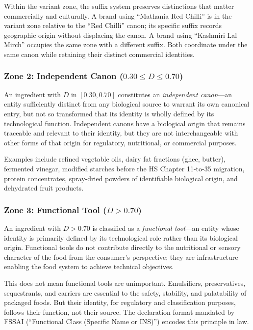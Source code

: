 \documentclass[12pt,a3paper]{article}
\begin{document}
Within the variant zone, the suffix system preserves distinctions that matter commercially and culturally. A brand using ``Mathania Red Chilli'' is in the variant zone relative to the ``Red Chilli'' canon; its specific suffix records geographic origin without displacing the canon. A brand using ``Kashmiri Lal Mirch'' occupies the same zone with a different suffix. Both coordinate under the same canon while retaining their distinct commercial identities.

\subsubsection{Zone 2: Independent Canon ($0.30 \leq D \leq 0.70$)}

An ingredient with $D$ in $[0.30, 0.70]$ constitutes an \textit{independent canon}---an entity sufficiently distinct from any biological source to warrant its own canonical entry, but not so transformed that its identity is wholly defined by its technological function. Independent canons have a biological origin that remains traceable and relevant to their identity, but they are not interchangeable with other forms of that origin for regulatory, nutritional, or commercial purposes.

Examples include refined vegetable oils, dairy fat fractions (ghee, butter), fermented vinegar, modified starches before the HS Chapter 11-to-35 migration, protein concentrates, spray-dried powders of identifiable biological origin, and dehydrated fruit products.

\subsubsection{Zone 3: Functional Tool ($D > 0.70$)}

An ingredient with $D > 0.70$ is classified as a \textit{functional tool}---an entity whose identity is primarily defined by its technological role rather than its biological origin. Functional tools do not contribute directly to the nutritional or sensory character of the food from the consumer's perspective; they are infrastructure enabling the food system to achieve technical objectives.

This does not mean functional tools are unimportant. Emulsifiers, preservatives, sequestrants, and carriers are essential to the safety, stability, and palatability of packaged foods. But their identity, for regulatory and classification purposes, follows their function, not their source. The declaration format mandated by FSSAI (``Functional Class (Specific Name or INS)'') encodes this principle in law.
\end{document}
